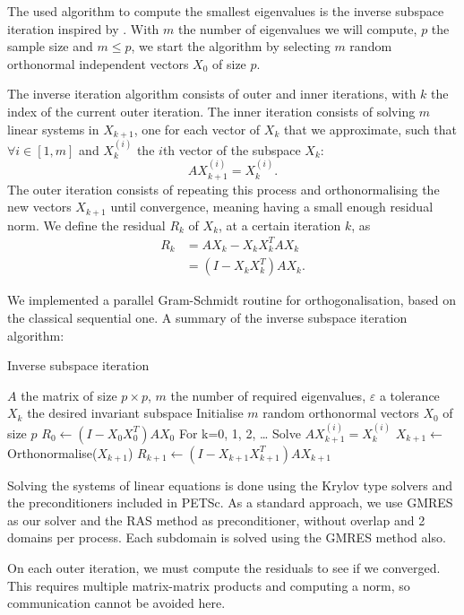 The used algorithm to compute the smallest eigenvalues is the inverse subspace iteration inspired by \cite{el_khoury_acceleration_2014}.
\ifthesis
 With \(m\) the number of eigenvalues we will compute, \(p\) the sample size and \(m \le p\), we start the algorithm by selecting \(m\) random orthonormal independent vectors \(X_0\) of size \(p\).
 
 The inverse iteration algorithm consists of outer and inner iterations, with \(k\) the index of the current outer iteration.
 The inner iteration consists of solving \(m\) linear systems in \(X_{k+1}\), one for each vector of \(X_k\) that we approximate, such that \(\forall i \in [1, m]\) and \(X_k^{(i)}\) the \(i\)th vector of the subspace \(X_k\):
 \[A X_{k+1}^{(i)} = X_k^{(i)}.\]
 The outer iteration consists of repeating this process and orthonormalising the new vectors \(X_{k+1}\) until convergence, meaning having a small enough residual norm.
 We define the residual \(R_k\) of \(X_k\), at a certain iteration \(k\), as
 \begin{equation}
  \begin{split}
   R_k & = A X_k - X_k X_k^T A X_k \\
       & = (I - X_k X_k^T) A X_k.
  \end{split}
 \end{equation}

 We implemented a parallel Gram-Schmidt routine for orthogonalisation, based on the classical sequential one.
 A summary of the inverse subspace iteration algorithm:

 \begin{algorithm}[H]
  \caption{Inverse subspace iteration}
  \begin{algorithmic}
   \REQUIRE \(A\) the matrix of size \(p \times p\), \(m\) the number of required eigenvalues, \(\varepsilon\) a tolerance
   \ENSURE \(X_k\) the desired invariant subspace
   \STATE Initialise \(m\) random orthonormal vectors \(X_0\) of size \(p\)
   \STATE \(R_0 \gets (I - X_0 X_0^T) A X_0\)
   \STATE For k=0, 1, 2, \dots
     \STATE Solve \(A X_{k+1}^{(i)} = X_k^{(i)}\)
    \ENDFOR
    \STATE \(X_{k+1} \gets \) Orthonormalise(\(X_{k+1}\))
    \STATE \(R_{k+1} \gets (I - X_{k+1} X_{k+1}^T) A X_{k+1}\)
   \ENDWHILE
  \end{algorithmic}
 \end{algorithm}
\fi

Solving the systems of linear equations is done using the Krylov type solvers and the preconditioners included in PETSc.
As a standard approach, we use GMRES as our solver and the RAS method as preconditioner, without overlap and 2 domains per process.
Each subdomain is solved using the GMRES method also.

On each outer iteration, we must compute the residuals to see if we converged.
This requires multiple matrix-matrix products and computing a norm, so communication cannot be avoided here.
